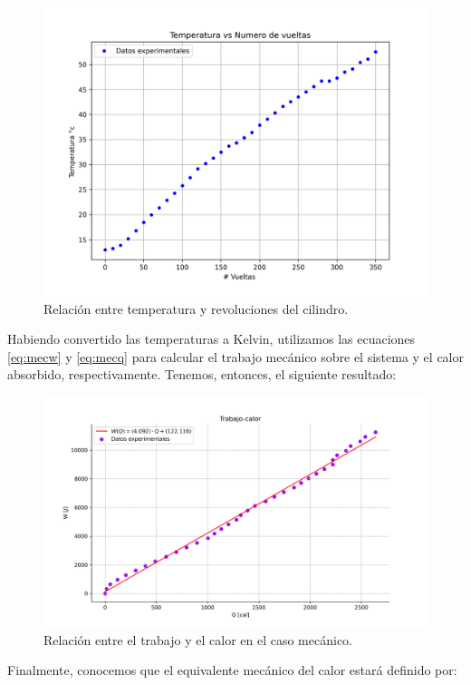 \documentclass{article}
\begin{document}
\begin{figure}[H]
    \centering
    \includegraphics[scale=0.5]{TvsV.png}
    \caption{Relación entre temperatura y revoluciones del cilindro.}
    \label{fig:mectemprev}
\end{figure}

Habiendo convertido las temperaturas a Kelvin, utilizamos las ecuaciones \ref{eq:mecw} y \ref{eq:mecq} para calcular el trabajo mecánico sobre el sistema y el calor absorbido, respectivamente. Tenemos, entonces, el siguiente resultado:

\begin{figure}[H]
    \centering
    \includegraphics[scale=0.5]{mecworkheat.png}
    \caption{Relación entre el trabajo y el calor en el caso mecánico.}
    \label{fig:mecworkheat}
\end{figure}

Finalmente, conocemos que el equivalente mecánico del calor estará definido por:
\end{document}
